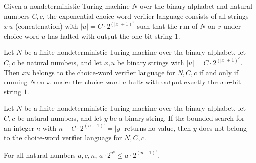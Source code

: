 \begin{definition}
\label{Complexity.e3ChoiceVerifier}
\leanok
{}
Given a nondeterministic Turing machine $N$ over the binary alphabet and natural numbers $C, c$, the exponential choice-word verifier language consists of all strings $x\,u$ (concatenation) with $|u| = C\cdot 2^{(|x|+1)^c}$ such that the run of $N$ on $x$ under choice word $u$ has halted with output the one-bit string $1$.
\end{definition}

\begin{lemma}
\label{Complexity.e3_choice_append}
\leanok
{}
Let $N$ be a finite nondeterministic Turing machine over the binary alphabet, let $C,c$
be natural numbers, and let $x,u$ be binary strings with $|u|=C\cdot 2^{(|x|+1)^c}$.
Then $xu$ belongs to the choice-word verifier language for $N,C,c$ if and only if
running $N$ on $x$ under the choice word $u$ halts with output exactly the one-bit
string $1$.
\end{lemma}

\begin{lemma}
\label{Complexity.e3_choice_no_split}
\leanok
{}
Let $N$ be a finite nondeterministic Turing machine over the binary alphabet, let $C,c$
be natural numbers, and let $y$ be a binary string. If the bounded search for an integer
$n$ with $n+C\cdot 2^{(n+1)^c}=|y|$ returns no value, then $y$ does not belong to the
choice-word verifier language for $N,C,c$.
\end{lemma}

\begin{lemma}
\label{Complexity.e3_choice_budget}
\leanok
{}
For all natural numbers $a,c,n$, $a\cdot 2^{n^c}\le a\cdot 2^{(n+1)^c}$.
\end{lemma}

